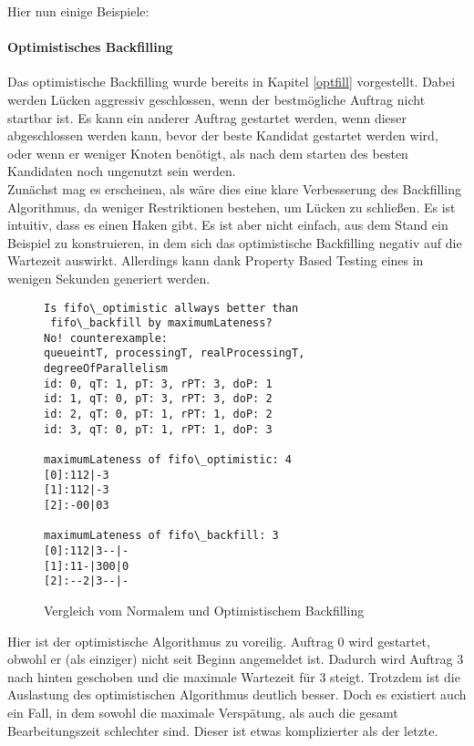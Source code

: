 Hier nun einige Beispiele:\\

\paragraph{Optimistisches Backfilling}
Das optimistische Backfilling wurde bereits in Kapitel \ref{optfill} vorgestellt. Dabei  werden Lücken aggressiv geschlossen, wenn der bestmögliche Auftrag nicht startbar ist. Es kann ein anderer Auftrag gestartet werden, wenn dieser abgeschlossen werden kann, bevor der beste Kandidat gestartet werden wird, oder wenn er weniger Knoten benötigt, als nach dem starten des besten Kandidaten noch ungenutzt sein werden.\\
Zunächst mag es erscheinen, als wäre dies eine klare Verbesserung des Backfilling Algorithmus, da weniger Restriktionen bestehen, um Lücken zu schließen. 
Es ist intuitiv, dass es einen Haken gibt. Es ist aber nicht einfach, aus dem Stand ein Beispiel zu konstruieren, in dem sich das optimistische Backfilling negativ auf die Wartezeit auswirkt. Allerdings kann dank Property Based Testing eines in wenigen Sekunden generiert werden.

\begin{figure}
\centering
\begin{verbatim}
Is fifo\_optimistic allways better than
 fifo\_backfill by maximumLateness?
No! counterexample:
queueintT, processingT, realProcessingT, degreeOfParallelism
id: 0, qT: 1, pT: 3, rPT: 3, doP: 1
id: 1, qT: 0, pT: 3, rPT: 3, doP: 2
id: 2, qT: 0, pT: 1, rPT: 1, doP: 2
id: 3, qT: 0, pT: 1, rPT: 1, doP: 3

maximumLateness of fifo\_optimistic: 4
[0]:112|-3
[1]:112|-3
[2]:-00|03

maximumLateness of fifo\_backfill: 3
[0]:112|3--|-
[1]:11-|300|0
[2]:--2|3--|-
\end{verbatim}
\caption{Vergleich vom Normalem und Optimistischem Backfilling}
\label{onlateness}
\end{figure}

\FloatBarrier

Hier ist der optimistische Algorithmus zu voreilig. Auftrag 0 wird gestartet, obwohl er (als einziger) nicht seit Beginn angemeldet ist. Dadurch wird Auftrag 3 nach hinten geschoben und die maximale Wartezeit für 3 steigt. Trotzdem ist die Auslastung des optimistischen Algorithmus deutlich besser. Doch es existiert auch ein Fall, in dem sowohl die maximale Verspätung, als auch die gesamt Bearbeitungszeit schlechter sind. Dieser ist etwas komplizierter als der letzte. \\


